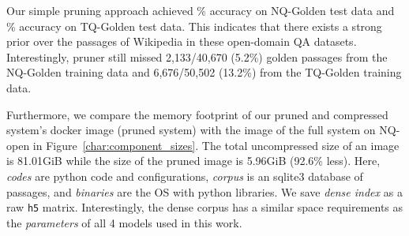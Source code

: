\documentclass[11pt,a4paper]{article}
\begin{document}
\begin{description}[style=unboxed,leftmargin=0em,listparindent=\parindent]
\item[Pruner.] Our simple pruning approach achieved \% accuracy on NQ-Golden test data and \% accuracy on TQ-Golden test data. 
This indicates that there exists a strong prior over the passages of Wikipedia in these open-domain QA datasets. 
Interestingly, pruner still missed 2,133/40,670 (5.2\%) golden passages from the NQ-Golden training data and 6,676/50,502 (13.2\%) from the TQ-Golden training data.

\item[Memory footprint.] 
Furthermore, we compare the memory footprint of our pruned and compressed system's docker image (pruned system) with the image of the full system on NQ-open in Figure~\ref{char:component_sizes}. 
The total uncompressed size of an image is 81.01GiB while the size of the pruned image is 5.96GiB (92.6\% less). 
Here, \emph{codes} are python code and configurations, \emph{corpus} is an sqlite3 database of passages, and \emph{binaries} are the OS with python libraries. 
We save \emph{dense index} as a raw \texttt{h5} matrix. Interestingly, the dense corpus has a similar space requirements as the \emph{parameters} of all 4 models used in this work.


\end{description}
\end{document}

